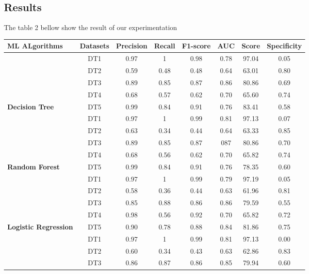 \subsection{Results}
The table 2 bellow show the result of our experimentation  
\begin{table}
\begin{tabular}{|l|c|c|c|c|c|c|c|}

\hline
\cline{2-8}
 \textbf{ML ALgorithms} &  \textbf{Datasets} & \textbf{Precision} & \textbf{Recall} & \textbf{F1-score}&\textbf{AUC} &\textbf{Score}&\textbf{Specificity}\tabularnewline
\hline
\cline{2-8}
 &  DT1 &0.97  & 1   & 0.98 & 0.78 & 97.04 & 0.05 \\
\cline{2-8}
& DT2 & 0.59 &0.48 &0.48  &0.64  &63.01  &0.80\\
\cline{2-8}
& DT3 &0.89  &0.85 &0.87  &0.86  &80.86  &0.69\\
\cline{2-8}
& DT4 &0.68  &0.57 &0.62  &0.70  &65.60  &0.74\\
\cline{2-8}
\multirow{-4}{*}{ \textbf{Decision Tree}}&   DT5 &0.99  &0.84 &0.91  &0.76  &83.41  &0.58\\
\hline
\cline{2-8}
&DT1 &0.97 &1   &0.99 &0.81 &97.13& 0.07\\
\cline{2-8}
 & DT2 &0.63  & 0.34  &0.44&0.64&63.33& 0.85\\
 \cline{2-8}
 & DT3 &0.89 &0.85 &0.87&087&80.86&0.70\\
 \cline{2-8}
 & DT4 &0.68 &0.56&0.62&0.70&65.82&0.74\\
\cline{2-8}
\multirow{-4}{*}{ \textbf{Random Forest}}&   DT5 &0.99 &0.84&0.91&0.76&78.35&0.60\\
\hline
\cline{2-8}
&DT1 &0.97 &1   &0.99 &0.79 &97.19&0.05 \\
\cline{2-8}
 &DT2 & 0.58 &0.36   &0.44&0.63&61.96&0.81\\
 \cline{2-8}
  &DT3 &0.85 &0.88 &0.86&0.86&79.59&0.55\\
  \cline{2-8}
  &DT4 &0.98 &0.56&0.92&0.70&65.82&0.72\\
  \cline{2-8}
\multirow{-4}{*}{ \textbf{Logistic Regression}}&   DT5 & 0.90&0.78&0.88&0.84&81.86&0.75\\
\hline
\cline{2-8}
& DT1 &0.97 &1   &0.99 &0.81 &97.13 &0.00\\
 \cline{2-8}
  &DT2 & 0.60 &0.34   &0.43&0.63&62.86&0.83 \\
  \cline{2-8}
  &DT3 &0.86 &0.87 &0.86&0.85&79.94&0.60\\
  \cline{2-8}

\end{tabular}
\end{table}
